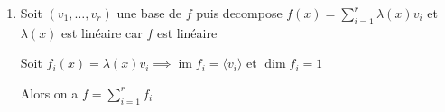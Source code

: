 \documentclass[12pt, a4paper]{article}
\newcommand{\im}{\operatorname{im}}
\begin{document}
\begin{enumerate}
\begin{align*}
    \end{align*}
    mais $\left\langle \left(\begin{array}{c} 1\\2\\0\\0\end{array}\right) , \left(\begin{array}{c} 2\\2\\-1\\1\end{array}\right), \left(\begin{array}{c} 0\\0\\1\\2\end{array} \right), \left(\begin{array}{c} 1\\0\\-1\\1\end{array} \right) \right\rangle$ n'est pas libre car $\left(\begin{array}{c} 1\\0\\-1\\1\end{array} \right) = \left(\begin{array}{c} 2\\2\\-1\\1\end{array} \right) - \left(\begin{array}{c} 1\\2\\0\\0\end{array}\right)$
 
  \item Soit $(v_1, \dots, v_r)$ une base de $f$ puis decompose $f(x) = \sum^r_{i=1} \lambda(x)v_i$ et $\lambda(x)$ est linéaire car $f$ est linéaire

    Soit $f_i(x) = \lambda(x)v_i \implies \im f_i = \langle v_i \rangle$ et $\dim f_i = 1$ 

    Alors on a $f = \sum^r_{i=1} f_i$


\end{enumerate}
\end{document}

